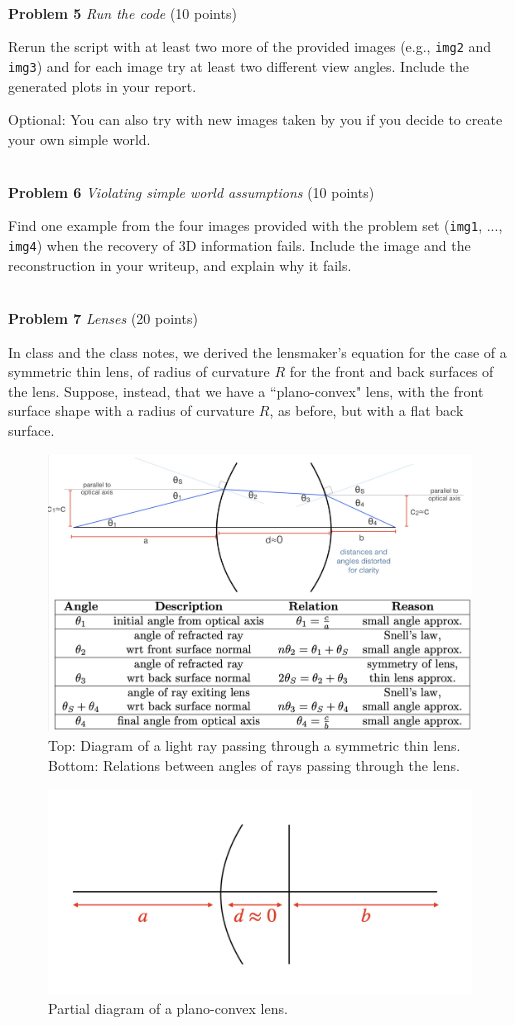 \documentclass[11pt]{article}
\newcommand{\hwproblem}[2] {\noindent \\ {\bf #1} {\it #2}}
\begin{document}
\hwproblem{Problem 5}{Run the code} (10 points)

Rerun the script with at least two more of the provided images (e.g., \texttt{img2} and \texttt{img3}) and for each image try at least two different view angles. Include the generated plots in your report.

Optional: You can also try with new images taken by you if you decide to create your own simple world.

\hwproblem{Problem 6}{Violating simple world assumptions} (10 points)

Find one example from the four images provided with the problem set (\texttt{img1}, ..., \texttt{img4}) when the recovery of 3D information fails. Include the image and the reconstruction in your writeup, and explain why it fails.

\hwproblem{Problem 7}{Lenses} (20 points)

In class and the class notes, we derived the lensmaker's equation for the case of a symmetric thin lens, of radius of curvature $R$ for the front and back surfaces of the lens. Suppose, instead, that we have a ``plano-convex" lens, with the front surface shape with a radius of curvature $R$, as before, but with a flat back surface.

\begin{figure}[!htb]
  \centering
  \includegraphics[width=.8\linewidth]{figures/fig_lens.png}
  \caption{Top: Diagram of a light ray passing through a symmetric thin lens. Bottom: Relations between angles of rays passing through the lens.}
  \label{fig_lens}
\end{figure}

\begin{figure}[!htb]
  \centering
  \includegraphics[width=.6\linewidth]{figures/fig_lens_plano_convex.png}
  \caption{Partial diagram of a plano-convex lens.}
  \label{fig_lens_planoconvex}
  \label{planoconv}
\end{figure}
\end{document}
